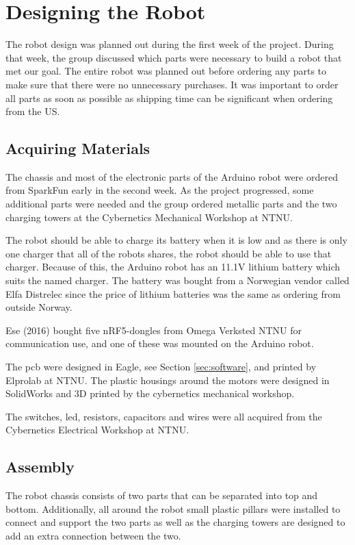 \section{Designing the Robot}
\label{sec:robotdesign}
The robot design was planned out during the first week of the project. During that week, the group discussed which parts were necessary to build a robot that met our goal. The entire robot was planned out before ordering any parts to make sure that there were no unnecessary purchases. It was important to order all parts as soon as possible as shipping time can be significant when ordering from the US.

\subsection{Acquiring Materials}
The chassis and most of the electronic parts of the Arduino robot were ordered from SparkFun \cite{sparkfun} early in the second week. As the project progressed, some additional parts were needed and the group ordered metallic parts and the two charging towers at the Cybernetics Mechanical Workshop at NTNU.

The robot should be able to charge its battery when it is low and as there is only one charger that all of the robots shares, the robot should be able to use that charger. Because of this, the Arduino robot has an 11.1V lithium battery which suits the named charger. The battery was bought from a Norwegian vendor called Elfa Distrelec\cite{elfa} since the price of lithium batteries was the same as ordering from outside Norway.

Ese (2016) bought five nRF5-dongles from Omega Verksted NTNU  for communication use, and one of these was mounted on the Arduino robot.

The \acrshort{pcb} were designed in Eagle, see Section \ref{sec:software}, and printed by Elprolab\cite{elprolab} at NTNU. The plastic housings around the motors were designed in SolidWorks and 3D printed by the cybernetics mechanical workshop.

The switches, \acrfull{led}, resistors, capacitors and wires were all acquired from the Cybernetics Electrical Workshop at NTNU.


\subsection{Assembly}
The robot chassis consists of two parts that can be separated into top and bottom. Additionally, all around the robot small plastic pillars were installed to connect and support the two parts as well as the charging towers are designed to add an extra connection between the two.

